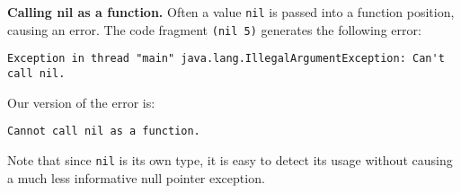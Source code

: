 \documentclass[submission,copyright,creativecommons]{eptcs}
\newcommand{\allcomments}[1]{{#1}}
\newcommand{\emcomment}[1]{{\bf \textcolor{ForestGreen}{\allcomments{{#1}}}}}
\newcommand{\hfcomment}[1]{\textcolor{Teal}{\allcomments{Henry: {#1}}}}
\begin{document}
{\bf Calling nil as a function.} Often a value {\tt nil} is passed into a function position, causing an error. 
The code fragment {\tt (nil 5)} generates the following error: 
\begin{verbatim}
Exception in thread "main" java.lang.IllegalArgumentException: Can't call nil. 
\end{verbatim}
Our version of the error is:
\begin{verbatim}
Cannot call nil as a function.
\end{verbatim}
Note that since {\tt nil} is its own type, it is easy to detect its usage without causing a much less informative null pointer exception. 

%
%
% 
%
% 
\end{document}
